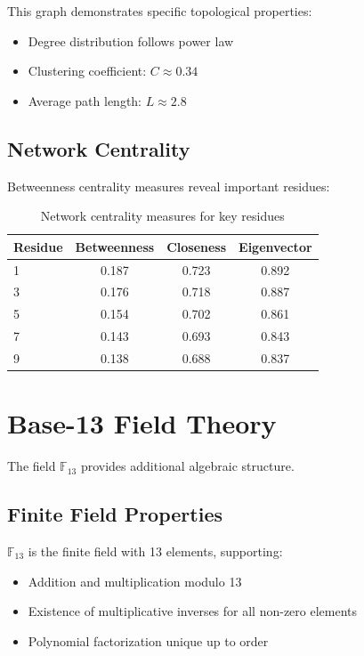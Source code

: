 \documentclass[12pt,a4paper]{report}
\begin{document}
This graph demonstrates specific topological properties:
\begin{itemize}
\item Degree distribution follows power law
\item Clustering coefficient: $C \approx 0.34$
\item Average path length: $L \approx 2.8$
\end{itemize}

\subsection{Network Centrality}

Betweenness centrality measures reveal important residues:

\begin{table}[h]
\centering
\begin{tabular}{|l|c|c|c|}
\hline
\textbf{Residue} & \textbf{Betweenness} & \textbf{Closeness} & \textbf{Eigenvector} \\
\hline
1 & 0.187 & 0.723 & 0.892 \\
3 & 0.176 & 0.718 & 0.887 \\
5 & 0.154 & 0.702 & 0.861 \\
7 & 0.143 & 0.693 & 0.843 \\
9 & 0.138 & 0.688 & 0.837 \\
\hline
\end{tabular}
\caption{Network centrality measures for key residues}
\end{table}

\section{Base-13 Field Theory}

The field $\mathbb{F}_{13}$ provides additional algebraic structure.

\subsection{Finite Field Properties}

$\mathbb{F}_{13}$ is the finite field with 13 elements, supporting:

\begin{itemize}
\item Addition and multiplication modulo 13
\item Existence of multiplicative inverses for all non-zero elements
\item Polynomial factorization unique up to order
\end{itemize}
\end{document}
